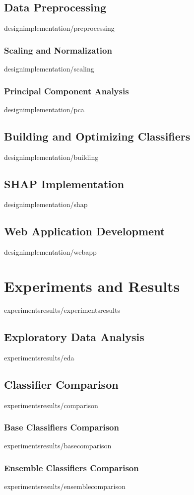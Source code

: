 \documentclass[covers, firstnumbered, tfg, extendedindex, epsbased, english, final]{tfgtfmthesisuam}
\begin{document}
\section{Data Preprocessing\label{SEC:PREPROCESSING}}{designimplementation/preprocessing}
\subsection{Scaling and Normalization}{designimplementation/scaling}
\subsection{Principal Component Analysis}{designimplementation/pca}
\section{Building and Optimizing Classifiers\label{SEC:BUILDING}}{designimplementation/building}
\section{SHAP Implementation}{designimplementation/shap}
\section{Web Application Development}{designimplementation/webapp}

\chapter{Experiments and Results\label{CAP:RESULTS}}{experimentsresults/experimentsresults}
\section{Exploratory Data Analysis}{experimentsresults/eda}
\section{Classifier Comparison}{experimentsresults/comparison}
\subsection{Base Classifiers Comparison}{experimentsresults/basecomparison}
\subsection{Ensemble Classifiers Comparison}{experimentsresults/ensemblecomparison}
\end{document}
